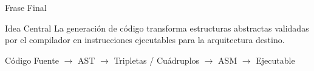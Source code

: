 \documentclass{beamer}
\begin{document}
\begin{frame}{Frase Final}

\begin{block}{Idea Central}
La generación de código transforma estructuras abstractas validadas por el compilador en instrucciones ejecutables para la arquitectura destino.
\end{block}

\vspace{0.5cm}

\centering

\Large

Código Fuente $\rightarrow$ AST $\rightarrow$ Tripletas / Cuádruplos $\rightarrow$ ASM $\rightarrow$ Ejecutable

\end{frame}
\end{document}

